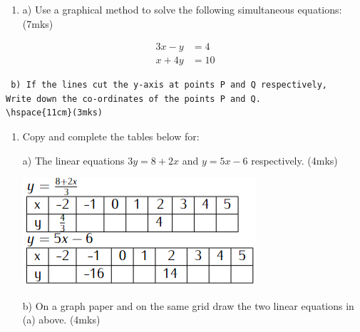 \documentclass[
  a4paperpaper,
]{scrbook}
\providecommand{\tightlist}{%
  \setlength{\itemsep}{0pt}\setlength{\parskip}{0pt}}\usepackage{longtable,booktabs,array}
\begin{document}
\begin{tcolorbox}[enhanced jigsaw, left=2mm, colframe=quarto-callout-note-color-frame, toptitle=1mm, opacitybacktitle=0.6, rightrule=.15mm, colbacktitle=quarto-callout-note-color!10!white, colback=white, arc=.35mm, breakable, leftrule=.75mm, bottomtitle=1mm, bottomrule=.15mm, title=\textcolor{quarto-callout-note-color}{\faInfo}\hspace{0.5em}{Problems to solve}, titlerule=0mm, coltitle=black, toprule=.15mm, opacityback=0]

\begin{enumerate}
\def\labelenumi{\arabic{enumi}.}
\tightlist
\item
  a) Use a graphical method to solve the following simultaneous
  equations: \hspace{2.5cm}(7mks)
\end{enumerate}

\begin{equation}
\begin{split}
3x-y&=4 \\
x+4y&=10
\end{split}
\end{equation}

\begin{verbatim}
 b) If the lines cut the y-axis at points P and Q respectively,
Write down the co-ordinates of the points P and Q.
\hspace{11cm}(3mks)
\end{verbatim}

\begin{enumerate}
\def\labelenumi{\arabic{enumi}.}
\setcounter{enumi}{1}
\item
  Copy and complete the tables below for:

  a) The linear equations \(3y=8+2x\) and \(y=5x-6\) respectively.
  \hspace{3.2cm}(4mks)

  \includegraphics{images/Cpt15_Q2.png}

  b) On a graph paper and on the same grid draw the two linear equations
  in (a) above. \hspace{3.2cm} (4mks)


\end{enumerate}
\end{tcolorbox}
\end{document}
